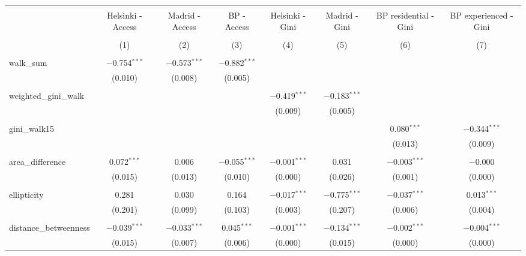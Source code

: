 
\begin{table}[!htbp] \centering 
  \caption{} 
  \label{} 
\begin{tabular}{@{\extracolsep{5pt}}lccccccc} 
\\[-1.8ex]\hline 
\hline \\[-1.8ex] 
 & Helsinki - Access & Madrid - Access & BP - Access & Helsinki - Gini & Madrid - Gini & BP residential - Gini & BP experienced - Gini \\ 
\\[-1.8ex] & (1) & (2) & (3) & (4) & (5) & (6) & (7)\\ 
\hline \\[-1.8ex] 
 walk\_sum & $-$0.754$^{***}$ & $-$0.573$^{***}$ & $-$0.882$^{***}$ &  &  &  &  \\ 
  & (0.010) & (0.008) & (0.005) &  &  &  &  \\ 
  & & & & & & & \\ 
 weighted\_gini\_walk &  &  &  & $-$0.419$^{***}$ & $-$0.183$^{***}$ &  &  \\ 
  &  &  &  & (0.009) & (0.005) &  &  \\ 
  & & & & & & & \\ 
 gini\_walk15 &  &  &  &  &  & 0.080$^{***}$ & $-$0.344$^{***}$ \\ 
  &  &  &  &  &  & (0.013) & (0.009) \\ 
  & & & & & & & \\ 
 area\_difference & 0.072$^{***}$ & 0.006 & $-$0.055$^{***}$ & $-$0.001$^{***}$ & 0.031 & $-$0.003$^{***}$ & $-$0.000 \\ 
  & (0.015) & (0.013) & (0.010) & (0.000) & (0.026) & (0.001) & (0.000) \\ 
  & & & & & & & \\ 
 ellipticity & 0.281 & 0.030 & 0.164 & $-$0.017$^{***}$ & $-$0.775$^{***}$ & $-$0.037$^{***}$ & 0.013$^{***}$ \\ 
  & (0.201) & (0.099) & (0.103) & (0.003) & (0.207) & (0.006) & (0.004) \\ 
  & & & & & & & \\ 
 distance\_betweenness & $-$0.039$^{***}$ & $-$0.033$^{***}$ & 0.045$^{***}$ & $-$0.001$^{***}$ & $-$0.134$^{***}$ & $-$0.002$^{***}$ & $-$0.004$^{***}$ \\ 
  & (0.015) & (0.007) & (0.006) & (0.000) & (0.015) & (0.000) & (0.000) \\ 

\end{tabular}
\end{table}
